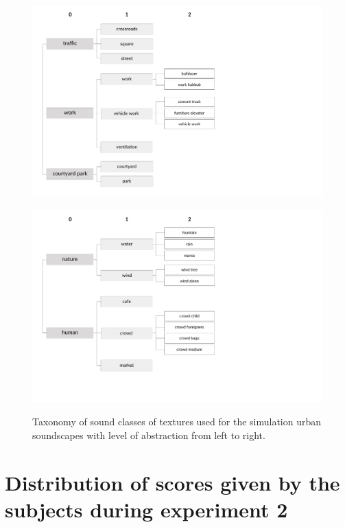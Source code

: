 \documentclass[preprint,12pt]{elsarticle}
\begin{document}
\begin{figure}[h]
  \centering
        {\includegraphics[trim={ 0 0 7cm 0},clip,width=.7\columnwidth]{gfx/ch_5/texture_1_en}\label{fig:taxonomieTexturea}} \par

        {\includegraphics[trim={ 0 0 7cm 1cm},clip,width=.7\columnwidth]{gfx/ch_5/texture_2_en}\label{fig:taxonomieTextureb}}
       \caption{Taxonomy of sound classes of textures used for the simulation urban soundscapes with level of abstraction from left to right.}
       \label{fig:taxonomieT}
\end{figure}

\newpage
\section{Distribution of scores given by the subjects during experiment 2}
\label{app:xp2}
\end{document}

